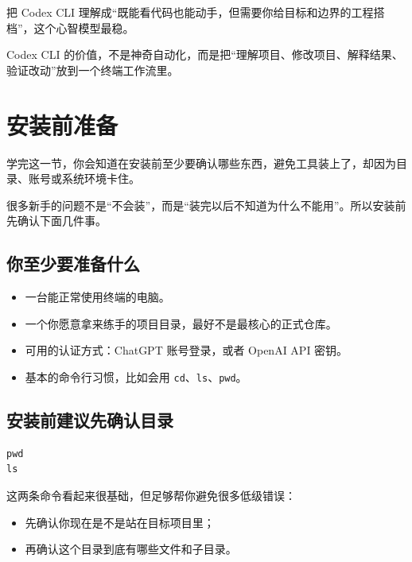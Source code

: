 \documentclass[UTF8,a4paper,12pt]{ctexart}
\begin{document}
\begin{tipbox}
把 Codex CLI 理解成“既能看代码也能动手，但需要你给目标和边界的工程搭档”，这个心智模型最稳。
\end{tipbox}

\begin{sumbox}
Codex CLI 的价值，不是神奇自动化，而是把“理解项目、修改项目、解释结果、验证改动”放到一个终端工作流里。
\end{sumbox}

\section{安装前准备}

\begin{learnbox}
学完这一节，你会知道在安装前至少要确认哪些东西，避免工具装上了，却因为目录、账号或系统环境卡住。
\end{learnbox}

很多新手的问题不是“不会装”，而是“装完以后不知道为什么不能用”。所以安装前先确认下面几件事。

\subsection{你至少要准备什么}

\begin{itemize}
  \item 一台能正常使用终端的电脑。
  \item 一个你愿意拿来练手的项目目录，最好不是最核心的正式仓库。
  \item 可用的认证方式：ChatGPT 账号登录，或者 OpenAI API 密钥。
  \item 基本的命令行习惯，比如会用 \texttt{cd}、\texttt{ls}、\texttt{pwd}。
\end{itemize}

\subsection{安装前建议先确认目录}

\begin{lstlisting}[style=cli]
pwd
ls
\end{lstlisting}

这两条命令看起来很基础，但足够帮你避免很多低级错误：
\begin{itemize}
  \item 先确认你现在是不是站在目标项目里；
  \item 再确认这个目录到底有哪些文件和子目录。
\end{itemize}
\end{document}
